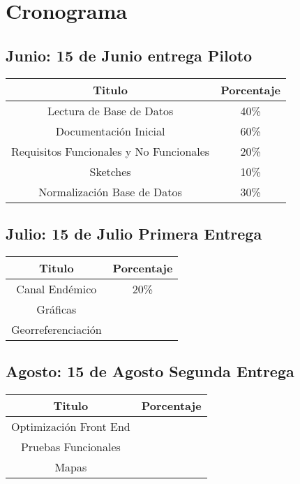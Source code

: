 \section{Cronograma}

\subsection{Junio: 15 de Junio entrega Piloto}

\begin{center}
\begin{tabular}{|c|c|}
\hline 
Titulo & Porcentaje \\ \hline
\hline
Lectura de Base de Datos & 40\% \\ \hline
Documentación Inicial & 60\% \\ \hline
Requisitos Funcionales y No Funcionales & 20\%\\ \hline
Sketches & 10\%\\ \hline
Normalización Base de Datos & 30\%\\ \hline

\end{tabular}
\end{center}

\subsection{Julio: 15 de Julio Primera Entrega}

\begin{center}
\begin{tabular}{|c|c|}
\hline 
Titulo & Porcentaje \\ \hline
\hline
Canal Endémico & 20\% \\ \hline
Gráficas & \\ \hline
Georreferenciación & \\ \hline
\end{tabular}
\end{center}


\subsection{Agosto: 15 de Agosto Segunda Entrega }


\begin{center}
\begin{tabular}{|c|c|}
\hline 
Titulo & Porcentaje \\ \hline
\hline
Optimización Front End & \\ \hline
Pruebas Funcionales & \\ \hline
Mapas & \\ \hline
\end{tabular}
\end{center}


